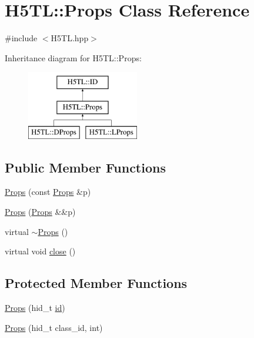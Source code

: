 \hypertarget{class_h5_t_l_1_1_props}{\section{H5\-T\-L\-:\-:Props Class Reference}
\label{class_h5_t_l_1_1_props}
}


{\ttfamily \#include $<$H5\-T\-L.\-hpp$>$}

Inheritance diagram for H5\-T\-L\-:\-:Props\-:\begin{figure}[H]
\begin{center}
\leavevmode
\includegraphics[height=3.000000cm]{class_h5_t_l_1_1_props}
\end{center}
\end{figure}
\subsection*{Public Member Functions}
\begin{DoxyCompactItemize}
\item 
\hyperlink{class_h5_t_l_1_1_props_a6ef94b756784840c67410dd5dacdfa40}{Props} (const \hyperlink{class_h5_t_l_1_1_props}{Props} \&p)
\item 
\hyperlink{class_h5_t_l_1_1_props_a3a3d47cfae590b862326a5f1d7de3090}{Props} (\hyperlink{class_h5_t_l_1_1_props}{Props} \&\&p)
\item 
virtual \hyperlink{class_h5_t_l_1_1_props_a90b5f20064452d9b1da869c2cbb317cb}{$\sim$\-Props} ()
\item 
virtual void \hyperlink{class_h5_t_l_1_1_props_a7c0e3fcebfb68468dc1c63958d31533b}{close} ()
\end{DoxyCompactItemize}
\subsection*{Protected Member Functions}
\begin{DoxyCompactItemize}
\item 
\hyperlink{class_h5_t_l_1_1_props_a3b066dc66162bf42d0c63b3aa0739444}{Props} (hid\-\_\-t \hyperlink{class_h5_t_l_1_1_i_d_ade483b65e8a77310b025e86b11cbc38c}{id})
\item 
\hyperlink{class_h5_t_l_1_1_props_a362a126d171e718c9505390e239759a6}{Props} (hid\-\_\-t class\-\_\-id, int)
\end{DoxyCompactItemize}
